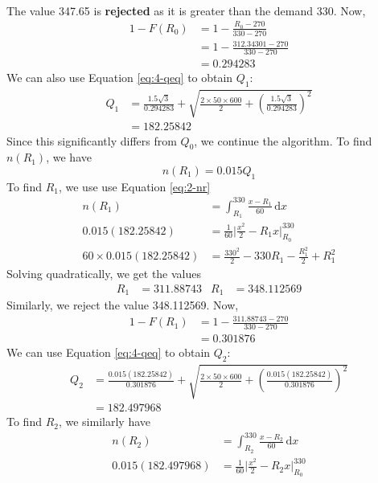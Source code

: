 \documentclass[12pt]{article}
\begin{document}
\begin{align*}
\end{align*}  The value 347.65 is \textbf{rejected} as it is greater than the demand 330. Now, \begin{align*}
    1-F(R_{0}) &= 1 - \frac{R_{0} - 270}{330-270} \\
    &= 1-\frac{312.34301 -270}{330-270} \\ 
    &= 0.294283
\end{align*} We can also use Equation \ref{eq:4-qeq} to obtain $Q_{1}$: \begin{align*}
    Q_{1} &= \frac{1.5\sqrt{3}}{0.294283} + \sqrt{ \frac{2 \times 50 \times 600}{2} + \left( \frac{1.5\sqrt{3}}{0.294283} \right)^{2}} \\ 
    &= 182.25842
\end{align*} Since this significantly differs from $Q_{0}$, we continue the algorithm. To find $n(R_{1})$, we have \begin{equation*}
    n(R_{1}) = 0.015 Q_{1} 
\end{equation*}  To find $R_{1}$, we use use Equation \ref{eq:2-nr} \begin{align*}
    n(R_{1}) &= \int_{R_{1}}^{330} \frac{x-R_{1}}{60} \, \mathrm{d}x \\ 
    0.015(182.25842) &= \frac{1}{60} \Big| \frac{x^{2}}{2} - R_{1}x \Big|^{330}_{R_{0}} \\ 
    60\times 0.015(182.25842) &= \frac{330^{2}}{2} - 330 R_{1} - \frac{R_{1}^{2}}{2} + R_{1}^{2} 
\end{align*} Solving quadratically, we get the values \begin{align*}
    R_{1} &= \mathbf{311.88743} & R_{1} &= 348.112569
\end{align*} Similarly, we reject the value 348.112569. Now, \begin{align*}
    1-F(R_{1}) &= 1- \frac{311.88743 - 270}{330-270} \\
    &= 0.301876
\end{align*} We can use Equation \ref{eq:4-qeq} to obtain $Q_{2}$: \begin{align*}
    Q_{2} &= \frac{0.015(182.25842)}{0.301876} + \sqrt{ \frac{2 \times 50 \times 600}{2} + \left( \frac{0.015(182.25842)}{0.301876} \right)^{2}} \\ 
    &= 182.497968
\end{align*} To find $R_{2}$, we similarly have \begin{align*}
    n(R_{2}) &= \int_{R_{2}}^{330} \frac{x-R_{2}}{60} \, \mathrm{d}x \\ 
    0.015(182.497968) &= \frac{1}{60} \Big| \frac{x^{2}}{2} - R_{2}x \Big|^{330}_{R_{0}} \\ 

\end{align*}
\end{document}

